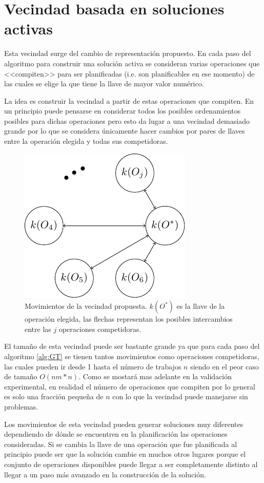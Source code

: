 \section{Vecindad basada en soluciones activas}
Esta vecindad surge del cambio de representación propuesto. En cada paso del algoritmo para construir una solución activa se consideran varias operaciones que <<compiten>> para ser planificadas (i.e. son planificables en ese momento) de las cuales se elige la que tiene la llave de mayor valor numérico. 

La idea es construir la vecindad a partir de estas operaciones que compiten. En un principio puede pensarse en considerar todos los posibles ordenamientos posibles para dichas operaciones pero esto da lugar a una vecindad demasiado grande por lo que se considera únicamente hacer cambios por pares de llaves entre la operación elegida y todas sus competidoras.
\begin{figure}[H]
\centering
\includegraphics[scale=1.3]{Imagenes/vec2.pdf}
\caption{Movimientos de la vecindad propuesta. $k(O^*)$ es la llave de la operación elegida, las flechas representan los posibles intercambios entre las $j$ operaciones competidoras.}
\end{figure}

El tamaño de esta vecindad puede ser bastante grande ya que para cada paso del algoritmo \ref{alg:GT} se tienen tantos movimientos como operaciones competidoras, las cuales pueden ir desde 1 hasta el número de trabajos $n$ siendo en el peor caso de tamaño $O(nm*n)$. Como se mostará mas adelante en la validación experimental, en realidad el número de operaciones que compiten por lo general es solo una fracción pequeña de $n$ con lo que la vecindad puede manejarse sin problemas.


Los movimientos de esta vecindad pueden generar soluciones muy diferentes dependiendo de dónde se encuentren en la planificación las operaciones consideradas. Si se cambia la llave de una operación que fue planificada al principio puede ser que la solución cambie en muchos otros lugares porque el conjunto de operaciones disponibles puede llegar a ser completamente distinto al llegar a un paso más avanzado en la construcción de la solución. 

